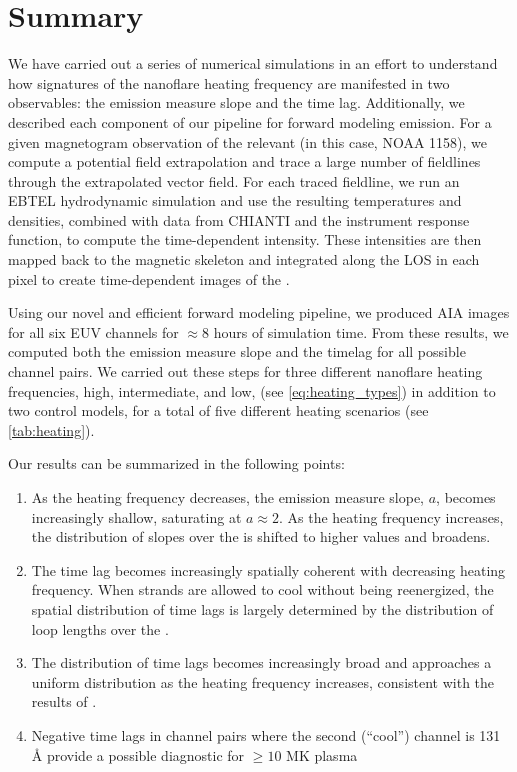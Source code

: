 
\section{Summary}\label{conclusions}

We have carried out a series of numerical simulations in an effort to understand how signatures of the nanoflare heating frequency are manifested in two observables: the emission measure slope and the time lag. Additionally, we described each component of our pipeline for forward modeling \AR{} emission. For a given magnetogram observation of the relevant \AR{} (in this case, NOAA 1158), we compute a potential field extrapolation and trace a large number of fieldlines through the extrapolated vector field. For each traced fieldline, we run an EBTEL hydrodynamic simulation and use the resulting temperatures and densities, combined with data from CHIANTI and the instrument response function, to compute the time-dependent intensity. These intensities are then mapped back to the magnetic skeleton and integrated along the LOS in each pixel to create time-dependent images of the \AR{}.

Using our novel and efficient forward modeling pipeline, we produced AIA images for all six EUV channels for $\approx8$ hours of simulation time. From these results, we computed both the emission measure slope and the timelag for all possible channel pairs. We carried out these steps for three different nanoflare heating frequencies, high, intermediate, and low, (see \autoref{eq:heating_types}) in addition to two control models, for a total of five different heating scenarios (see \autoref{tab:heating}).

Our results can be summarized in the following points:
\begin{enumerate}
    \item As the heating frequency decreases, the emission measure slope, $a$, becomes increasingly shallow, saturating at $a\approx2$. As the heating frequency increases, the distribution of slopes over the \AR{} is shifted to higher values and broadens.
    \item The time lag becomes increasingly spatially coherent with decreasing heating frequency. When strands are allowed to cool without being reenergized, the spatial distribution of time lags is largely determined by the distribution of loop lengths over the \AR{}.
    \item The distribution of time lags becomes increasingly broad and approaches a uniform distribution as the heating frequency increases, consistent with the results of \citet{viall_signatures_2016}.
    \item Negative time lags in channel pairs where the second (``cool'') channel is 131 \AA{} provide a possible diagnostic for $\ge10$ MK plasma
\end{enumerate}

